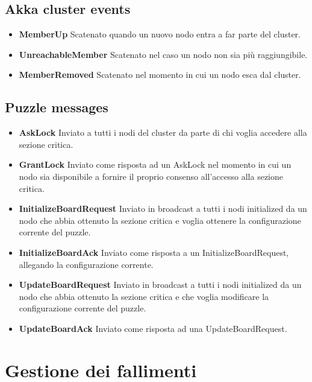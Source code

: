 \subsection{Akka cluster events}
\begin{itemize}
    \item \textbf{MemberUp}\newline
    Scatenato quando un nuovo nodo entra a far parte del cluster.
    \item \textbf{UnreachableMember}\newline
    Scatenato nel caso un nodo non sia più raggiungibile.
    \item \textbf{MemberRemoved}\newline
    Scatenato nel momento in cui un nodo esca dal cluster.
\end{itemize}
\subsection{Puzzle messages}
\begin{itemize}
    \item \textbf{AskLock}\newline
    Inviato a tutti i nodi del cluster da parte di chi voglia accedere alla sezione critica.
    \item \textbf{GrantLock}\newline
    Inviato come risposta ad un AskLock nel momento in cui un nodo sia disponibile a fornire il proprio consenso all'accesso alla sezione critica.
    \item \textbf{InitializeBoardRequest}\newline
    Inviato in broadcast a tutti i nodi initialized da un nodo che abbia ottenuto la sezione critica e voglia ottenere la configurazione corrente del puzzle.
    \item \textbf{InitializeBoardAck}\newline
    Inviato come risposta a un InitializeBoardRequest, allegando la configurazione corrente.
    \item \textbf{UpdateBoardRequest}\newline
    Inviato in broadcast a tutti i nodi initialized da un nodo che abbia ottenuto la sezione critica e che voglia modificare la configurazione corrente del puzzle.
    \item \textbf{UpdateBoardAck}\newline
    Inviato come risposta ad una UpdateBoardRequest.
\end{itemize}
\section{Gestione dei fallimenti} \label{fallimentiAkka}
